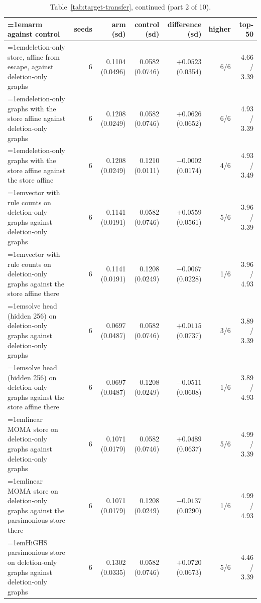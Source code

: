 \begin{table}[H]
  \centering
  \footnotesize
  \setlength{\tabcolsep}{2.5pt}
  \caption[The rounds on betaxanthin: arm against control, continued]{Table~\ref{tab:target-transfer}, continued (part 2 of 10).}
  \label{tab:target-transfer-2}
  \begin{tabular}{@{}>{\raggedright\hangindent=1em\hangafter=1\arraybackslash}p{78.5mm}rrrrrr@{}}
    \hline
    arm against control & seeds & arm (sd) & control (sd) & difference (sd) & higher & top-50 \\
    \hline
    deletion-only store, affine from escape, against deletion-only graphs & 6 & 0.1104 (0.0496) & 0.0582 (0.0746) & $+0.0523$ (0.0354) & 6/6 & 4.66 / 3.39 \\
    deletion-only graphs with the store affine against deletion-only graphs & 6 & 0.1208 (0.0249) & 0.0582 (0.0746) & $+0.0626$ (0.0652) & 6/6 & 4.93 / 3.39 \\
    deletion-only graphs with the store affine against the store affine & 6 & 0.1208 (0.0249) & 0.1210 (0.0111) & $-0.0002$ (0.0174) & 4/6 & 4.93 / 3.49 \\
    vector with rule counts on deletion-only graphs against deletion-only graphs & 6 & 0.1141 (0.0191) & 0.0582 (0.0746) & $+0.0559$ (0.0561) & 5/6 & 3.96 / 3.39 \\
    vector with rule counts on deletion-only graphs against the store affine there & 6 & 0.1141 (0.0191) & 0.1208 (0.0249) & $-0.0067$ (0.0228) & 1/6 & 3.96 / 4.93 \\
    solve head (hidden 256) on deletion-only graphs against deletion-only graphs & 6 & 0.0697 (0.0487) & 0.0582 (0.0746) & $+0.0115$ (0.0737) & 3/6 & 3.89 / 3.39 \\
    solve head (hidden 256) on deletion-only graphs against the store affine there & 6 & 0.0697 (0.0487) & 0.1208 (0.0249) & $-0.0511$ (0.0608) & 1/6 & 3.89 / 4.93 \\
    linear MOMA store on deletion-only graphs against deletion-only graphs & 6 & 0.1071 (0.0179) & 0.0582 (0.0746) & $+0.0489$ (0.0637) & 5/6 & 4.99 / 3.39 \\
    linear MOMA store on deletion-only graphs against the parsimonious store there & 6 & 0.1071 (0.0179) & 0.1208 (0.0249) & $-0.0137$ (0.0290) & 1/6 & 4.99 / 4.93 \\
    HiGHS parsimonious store on deletion-only graphs against deletion-only graphs & 6 & 0.1302 (0.0335) & 0.0582 (0.0746) & $+0.0720$ (0.0673) & 5/6 & 4.46 / 3.39 \\

\end{tabular}
\end{table}
